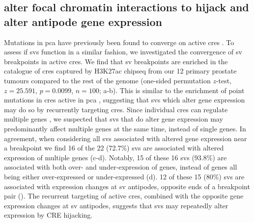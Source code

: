 \subsection{ alter focal chromatin interactions to hijack  and alter antipode gene expression}

Mutations in \gls{pca} have previously been found to converge on active \glspl{cre} \cite{mazrooeiCistromePartitioningReveals2019}.
To assess if \glspl{sv} function in a similar fashion, we investigated the convergence of \gls{sv} breakpoints in active \glspl{cre}.
We find that \gls{sv} breakpoints are enriched in the catalogue of \glspl{cre} captured by H3K27ac \gls{chipseq} from our 12 primary prostate tumours compared to the rest of the genome (one-sided permutation $z$-test, $z = 25.591$, $p = 0.0099$, $n = 100$; a-b).
This is similar to the enrichment of point mutations in \glspl{cre} active in \gls{pca} \cite{mazrooeiCistromePartitioningReveals2019}, suggesting that \glspl{sv} which alter gene expression may do so by recurrently targeting \glspl{cre}.
Since individual \glspl{cre} can regulate multiple genes \cite{gasperiniGenomewideFrameworkMapping2019}, we suspected that \glspl{sv} that do alter gene expression may predominantly affect multiple genes at the same time, instead of single genes.
In agreement, when considering all \glspl{sv} associated with altered gene expression near a breakpoint we find 16 of the 22 (72.7\%) \glspl{sv} are associated with altered expression of multiple genes (c-d).
Notably, 15 of these 16 \glspl{sv} (93.8\%) are associated with both over- and under-expression of genes, instead of genes all being either over-expressed or under-expressed (d).
12 of these 15 (80\%) \glspl{sv} are associated with expression changes at \gls{sv} antipodes, opposite ends of a breakpoint pair ().
The recurrent targeting of active \glspl{cre}, combined with the opposite gene expression changes at \gls{sv} antipodes, suggests that \glspl{sv} may repeatedly alter expression by CRE hijacking.


